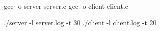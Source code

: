 gcc -\/o server server.\+c gcc -\/o client client.\+c

./server -\/l server.\+log -\/t 30 ./client -\/l client.\+log -\/t 20 